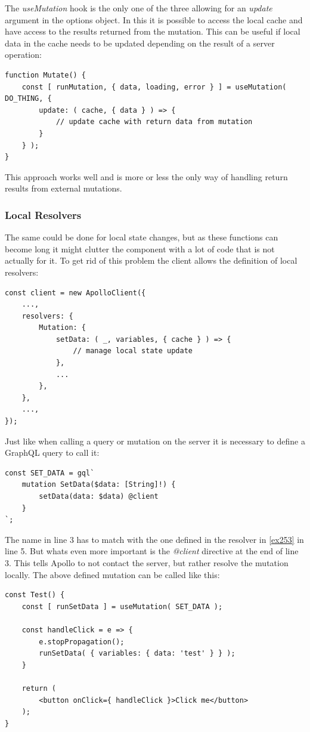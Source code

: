 The \emph{useMutation} hook is the only one of the three allowing for an \emph{update} argument in the options object. In this it is possible to access the local cache and have access to the results returned from the mutation. This can be useful if local data in the cache needs to be updated depending on the result of a server operation:
\begin{lstlisting}[caption={Creating a Mutation and defining a manual update function},label={ex:usingMutation}]
function Mutate() {
	const [ runMutation, { data, loading, error } ] = useMutation( DO_THING, {
		update: ( cache, { data } ) => {
			// update cache with return data from mutation
		}	
	} );
}
\end{lstlisting}
This approach works well and is more or less the only way of handling return results from external mutations. 

\subsubsection{Local Resolvers}
The same could be done for local state changes, but as these functions can become long it might clutter the component with a lot of code that is not actually for it. To get rid of this problem the client allows the definition of local resolvers:
\begin{lstlisting}[caption={Local Resolvers},label={ex253}]
const client = new ApolloClient({
	...,
	resolvers: {
		Mutation: {
			setData: ( _, variables, { cache } ) => {
				// manage local state update			
			},
			...		
		},	
	},
	...,
});
\end{lstlisting}

Just like when calling a query or mutation on the server it is necessary to define a GraphQL query to call it:
\lstset{language=GraphQL}
\begin{lstlisting}[caption={Query Definition for a Mutation in the Client}]
const SET_DATA = gql`
	mutation SetData($data: [String]!) {
		setData(data: $data) @client	
	}
`;
\end{lstlisting}
The name in line 3 has to match with the one defined in the resolver in \autoref{ex253} in line 5. But whats even more important is the \emph{@client} directive at the end of line 3. This tells Apollo to not contact the server, but rather resolve the mutation locally. The above defined mutation can be called like this:
\lstset{language=JavaScript}
\begin{lstlisting}[caption={Using the Client Side Mutation}]
const Test() {
	const [ runSetData ] = useMutation( SET_DATA );
	
	const handleClick = e => {
		e.stopPropagation();
		runSetData(	{ variables: { data: 'test' } } );
	}
	
	return (
		<button onClick={ handleClick }>Click me</button>
	);
}
\end{lstlisting}

